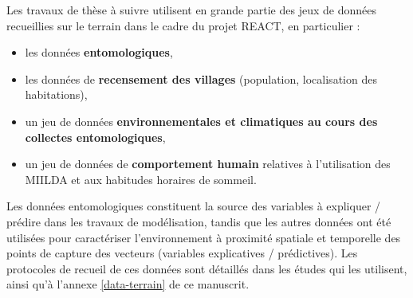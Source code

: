 \documentclass[12pt,twoside]{reedthesis}
\providecommand{\tightlist}{%
  \setlength{\itemsep}{0pt}\setlength{\parskip}{0pt}}
\begin{document}
Les travaux de thèse à suivre utilisent en grande partie des jeux de données recueillies sur le terrain dans le cadre du projet REACT, en particulier :
\begin{itemize}
\tightlist
\item
  les données \textbf{entomologiques},
\item
  les données de \textbf{recensement des villages} (population, localisation des habitations),
\item
  un jeu de données \textbf{environnementales et climatiques au cours des collectes entomologiques},
\item
  un jeu de données de \textbf{comportement humain} relatives à l'utilisation des MIILDA et aux habitudes horaires de sommeil.
\end{itemize}
Les données entomologiques constituent la source des variables à expliquer / prédire dans les travaux de modélisation, tandis que les autres données ont été utilisées pour caractériser l'environnement à proximité spatiale et temporelle des points de capture des vecteurs (variables explicatives / prédictives). Les protocoles de recueil de ces données sont détaillés dans les études qui les utilisent, ainsi qu'à l'annexe \ref{data-terrain} de ce manuscrit.\\
\end{document}
